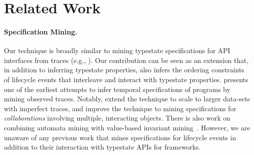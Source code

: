 \documentclass[10pt,reprint,nocopyrightspace,numbers]{sigplanconf}
\begin{document}



\section{Related Work}
\label{sec:related-work}


\paragraph{Specification Mining.}
Our technique is broadly similar to mining typestate specifications for API interfaces from traces (e.g., \cite{whaley-spec-mining, acharya-fsm-mining, dallmeier-fsm-mining, gabel-fsm-mining, walkinshaw-ltl-fms-mining,popl-spec-mining,perracotta,DBLP:conf/kbse/PradelG09}). Our contribution can be seen as an extension that, in addition to inferring typestate properties, also infers the ordering constraints of lifecycle events that interleave and interact with typestate properties.
\citet{popl-spec-mining} presents one of the earliest attempts to infer temporal specifications of programs by mining observed traces. Notably, \citet{perracotta} extend the technique to scale to larger data-sets with imperfect traces, and \citet{DBLP:conf/kbse/PradelG09} improve the technique to mining specifications for \emph{collaborations} involving multiple, interacting objects.
%
There is also work on combining automata mining with value-based invariant mining~\cite{value-sequence-mining, efsm-models}.
However, we are unaware of any previous work that mines specifications for lifecycle events in addition to their interaction with typestate APIs for frameworks.
\end{document}
